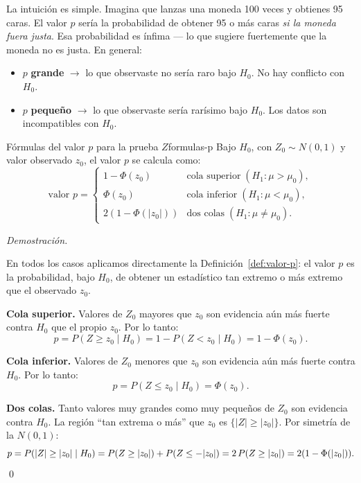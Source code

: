 \documentclass[12pt, a4paper]{book}
\renewenvironment{proof}{%
    \par\medskip\noindent\textit{Demostraci\'{o}n.}\enspace
}{\qed\par\medskip}
\numberwithin{equation}{chapter}
\begin{document}
La intuici\'{o}n es simple. Imagina que lanzas
una moneda 100 veces y obtienes 95 caras. El
valor $p$ ser\'{i}a la probabilidad de obtener
95 o m\'{a}s caras \emph{si la moneda fuera
	justa}. Esa probabilidad es \'{i}nfima ---
lo que sugiere fuertemente que la moneda no
es justa. En general:
\begin{itemize}[leftmargin=2em]
	\item $p$ \textbf{grande} $\to$ lo que
	observaste no ser\'{i}a raro bajo $H_0$.
	No hay conflicto con $H_0$.
	\item $p$ \textbf{peque\~{n}o} $\to$ lo que
	observaste ser\'{i}a rar\'{i}simo bajo $H_0$.
	Los datos son incompatibles con $H_0$.
\end{itemize}

\begin{proposicion}{F\'{o}rmulas del valor $p$
		para la prueba $Z$}{formulas-p}
	Bajo $H_0$, con $Z_0 \sim N(0,1)$ y valor
	observado $z_0$, el valor $p$ se calcula como:
	\[
	\text{valor } p = \begin{cases}
		1 - \Phi(z_0)      & \text{cola superior}
		\; (H_1: \mu > \mu_0), \\[4pt]
		\Phi(z_0)          & \text{cola inferior}
		\; (H_1: \mu < \mu_0), \\[4pt]
		2(1-\Phi(|z_0|))   & \text{dos colas}
		\; (H_1: \mu \neq \mu_0).
	\end{cases}
	\]
\end{proposicion}

\begin{proof}
	En todos los casos aplicamos directamente la
	Definici\'{o}n~\ref{def:valor-p}: el valor $p$
	es la probabilidad, bajo $H_0$, de obtener un
	estad\'{i}stico tan extremo o m\'{a}s extremo
	que el observado $z_0$.
	
	\medskip
	\textbf{Cola superior.} Valores de $Z_0$
	mayores que $z_0$ son evidencia a\'{u}n m\'{a}s
	fuerte contra $H_0$ que el propio $z_0$. Por
	lo tanto:
	\[
	p = P(Z \geq z_0 \mid H_0)
	= 1 - P(Z < z_0 \mid H_0)
	= 1 - \Phi(z_0).
	\]
	
	\medskip
	\textbf{Cola inferior.} Valores de $Z_0$
	menores que $z_0$ son evidencia a\'{u}n m\'{a}s
	fuerte contra $H_0$. Por lo tanto:
	\[
	p = P(Z \leq z_0 \mid H_0)
	= \Phi(z_0).
	\]
	
	\medskip
	\textbf{Dos colas.} Tanto valores muy grandes
	como muy peque\~{n}os de $Z_0$ son evidencia
	contra $H_0$. La regi\'{o}n ``tan extrema o
	m\'{a}s'' que $z_0$ es $\{|Z| \geq |z_0|\}$.
	Por simetr\'{i}a de la $N(0,1)$:
	\[
	p = P(|Z| \geq |z_0| \mid H_0)
	= P(Z \geq |z_0|) + P(Z \leq -|z_0|)
	= 2\,P(Z \geq |z_0|)
	= 2(1 - \Phi(|z_0|)). \qedhere
	\]
\end{proof}
\end{document}
